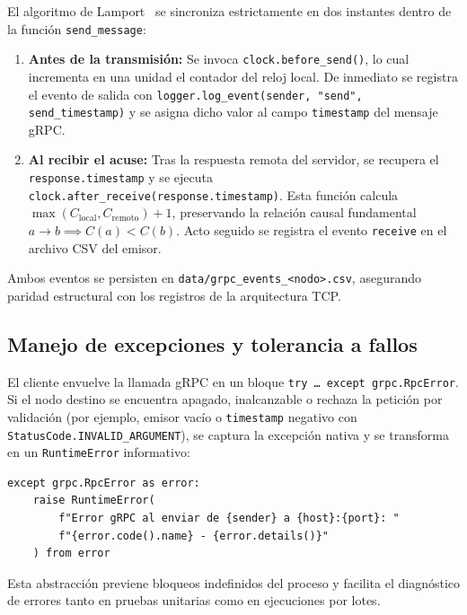 El algoritmo de Lamport~\cite{lamport1978} se sincroniza estrictamente en dos
instantes dentro de la función \texttt{send\_message}:

\begin{enumerate}
  \item \textbf{Antes de la transmisión:} Se invoca \texttt{clock.before\_send()},
        lo cual incrementa en una unidad el contador del reloj local. De inmediato
        se registra el evento de salida con
        \texttt{logger.log\_event(sender, "send", send\_timestamp)} y se asigna dicho
        valor al campo \texttt{timestamp} del mensaje gRPC.
  \item \textbf{Al recibir el acuse:} Tras la respuesta remota del servidor, se
        recupera el \texttt{response.timestamp} y se ejecuta
        \texttt{clock.after\_receive(response.timestamp)}. Esta función calcula
        $\max(C_{\text{local}}, C_{\text{remoto}}) + 1$, preservando la relación
        causal fundamental $a \to b \implies C(a) < C(b)$. Acto seguido se registra
        el evento \texttt{receive} en el archivo CSV del emisor.
\end{enumerate}

Ambos eventos se persisten en \texttt{data/grpc\_events\_\textless{}nodo\textgreater{}.csv},
asegurando paridad estructural con los registros de la arquitectura TCP.

\subsection{Manejo de excepciones y tolerancia a fallos}

El cliente envuelve la llamada gRPC en un bloque \texttt{try \dots\ except grpc.RpcError}.
Si el nodo destino se encuentra apagado, inalcanzable o rechaza la petición por
validación (por ejemplo, emisor vacío o \texttt{timestamp} negativo con
\texttt{StatusCode.INVALID\_ARGUMENT}), se captura la excepción nativa y se
transforma en un \texttt{RuntimeError} informativo:

\begin{verbatim}
except grpc.RpcError as error:
    raise RuntimeError(
        f"Error gRPC al enviar de {sender} a {host}:{port}: "
        f"{error.code().name} - {error.details()}"
    ) from error
\end{verbatim}

Esta abstracción previene bloqueos indefinidos del proceso y facilita el
diagnóstico de errores tanto en pruebas unitarias como en ejecuciones por
lotes.

